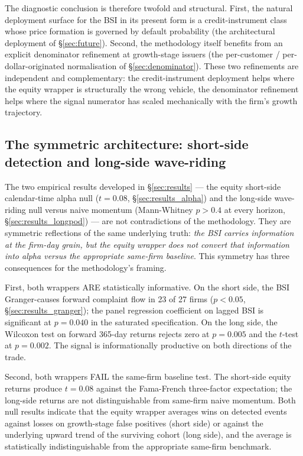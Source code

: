 \documentclass[11pt,a4paper]{article}
\begin{document}
The diagnostic conclusion is therefore twofold and structural. First, the natural deployment surface for the BSI in its present form is a credit-instrument class whose price formation is governed by default probability (the architectural deployment of §\ref{sec:future}). Second, the methodology itself benefits from an explicit denominator refinement at growth-stage issuers (the per-customer / per-dollar-originated normalisation of §\ref{sec:denominator}). These two refinements are independent and complementary: the credit-instrument deployment helps where the equity wrapper is structurally the wrong vehicle, the denominator refinement helps where the signal numerator has scaled mechanically with the firm's growth trajectory.

\subsection{The symmetric architecture: short-side detection and long-side wave-riding}\label{sec:symmetric}

The two empirical results developed in §\ref{sec:results} --- the equity short-side calendar-time alpha null ($t = 0.08$, §\ref{sec:results_alpha}) and the long-side wave-riding null versus naive momentum (Mann-Whitney $p > 0.4$ at every horizon, §\ref{sec:results_longpod}) --- are not contradictions of the methodology. They are symmetric reflections of the same underlying truth: \emph{the BSI carries information at the firm-day grain, but the equity wrapper does not convert that information into alpha versus the appropriate same-firm baseline}. This symmetry has three consequences for the methodology's framing.

First, both wrappers ARE statistically informative. On the short side, the BSI Granger-causes forward complaint flow in 23 of 27 firms ($p < 0.05$, §\ref{sec:results_granger}); the panel regression coefficient on lagged BSI is significant at $p = 0.040$ in the saturated specification. On the long side, the Wilcoxon test on forward 365-day returns rejects zero at $p = 0.005$ and the $t$-test at $p = 0.002$. The signal is informationally productive on both directions of the trade.

Second, both wrappers FAIL the same-firm baseline test. The short-side equity returns produce $t = 0.08$ against the Fama-French three-factor expectation; the long-side returns are not distinguishable from same-firm naive momentum. Both null results indicate that the equity wrapper averages wins on detected events against losses on growth-stage false positives (short side) or against the underlying upward trend of the surviving cohort (long side), and the average is statistically indistinguishable from the appropriate same-firm benchmark.
\end{document}
